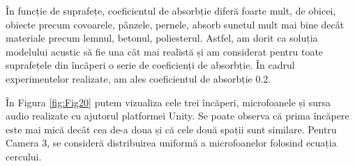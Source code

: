 	În funcție de suprafețe, coeficientul de absorbție diferă foarte mult, de obicei, obiecte precum covoarele, pânzele, pernele, absorb sunetul mult mai bine decât materiale precum lemnul, betonul, poliesterul. Astfel, am dorit ca soluția modelului acustic să fie una cât mai realistă și am considerat pentru toate suprafețele din încăperi o serie de coeficienți de absorbție. În cadrul experimentelor realizate, am ales coeficientul de absorbție 0.2.

	În Figura \ref{fig:Fig20} putem vizualiza cele trei încăperi, microfoanele și sursa audio realizate cu ajutorul platformei Unity. Se poate observa că prima încăpere este mai mică decât cea de-a doua și că cele două spații sunt similare. Pentru Camera 3, se consideră distribuirea uniformă a microfoanelor folosind ecuația cercului.
	
